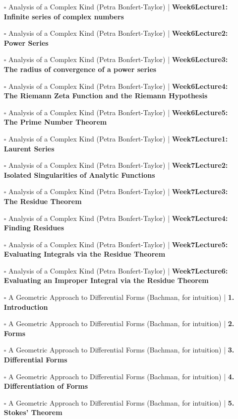 \documentclass[a4, landscape, 12pt]{article}
\newcommand{\checkbox}{$\square$}%
\begin{document}
\begin{itemize}
{}
\item [\checkbox] Analysis of a Complex Kind (Petra Bonfert-Taylor)  | \textbf{Week6Lecture1: Infinite series of complex numbers
}
\item [\checkbox] Analysis of a Complex Kind (Petra Bonfert-Taylor)  | \textbf{Week6Lecture2: Power Series
}
\item [\checkbox] Analysis of a Complex Kind (Petra Bonfert-Taylor)  | \textbf{Week6Lecture3: The radius of convergence of a power series
}
\item [\checkbox] Analysis of a Complex Kind (Petra Bonfert-Taylor)  | \textbf{Week6Lecture4: The Riemann Zeta Function and the Riemann Hypothesis
}
\item [\checkbox] Analysis of a Complex Kind (Petra Bonfert-Taylor)  | \textbf{Week6Lecture5: The Prime Number Theorem
}
\item [\checkbox] Analysis of a Complex Kind (Petra Bonfert-Taylor)  | \textbf{Week7Lecture1: Laurent Series
}
\item [\checkbox] Analysis of a Complex Kind (Petra Bonfert-Taylor)  | \textbf{Week7Lecture2: Isolated Singularities of Analytic Functions
}
\item [\checkbox] Analysis of a Complex Kind (Petra Bonfert-Taylor)  | \textbf{Week7Lecture3: The Residue Theorem
}
\item [\checkbox] Analysis of a Complex Kind (Petra Bonfert-Taylor)  | \textbf{Week7Lecture4: Finding Residues
}
\item [\checkbox] Analysis of a Complex Kind (Petra Bonfert-Taylor)  | \textbf{Week7Lecture5: Evaluating Integrals via the Residue Theorem
}
\item [\checkbox] Analysis of a Complex Kind (Petra Bonfert-Taylor)  | \textbf{Week7Lecture6: Evaluating an Improper Integral via the Residue Theorem
}
\item [\checkbox] A Geometric Approach to Differential Forms (Bachman, for intuition)  | \textbf{1. Introduction
}
\item [\checkbox] A Geometric Approach to Differential Forms (Bachman, for intuition)  | \textbf{2. Forms
}
\item [\checkbox] A Geometric Approach to Differential Forms (Bachman, for intuition)  | \textbf{3. Differential Forms
}
\item [\checkbox] A Geometric Approach to Differential Forms (Bachman, for intuition)  | \textbf{4. Differentiation of Forms
}
\item [\checkbox] A Geometric Approach to Differential Forms (Bachman, for intuition)  | \textbf{5. Stokes’ Theorem
}
\end{itemize}
\end{document}

